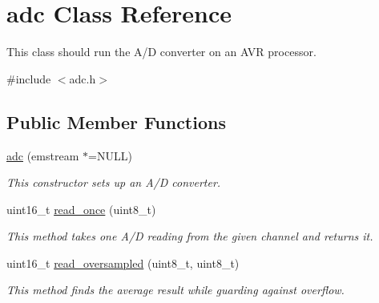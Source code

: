 \hypertarget{classadc}{\section{adc \-Class \-Reference}
\label{classadc}
}


\-This class should run the \-A/\-D converter on an \-A\-V\-R processor.  




{\ttfamily \#include $<$adc.\-h$>$}

\subsection*{\-Public \-Member \-Functions}
\begin{DoxyCompactItemize}
\item 
\hyperlink{classadc_af3b8262c08f5fc5ae325a20622883424}{adc} (emstream $\ast$=\-N\-U\-L\-L)
\begin{DoxyCompactList}\small\item\em \-This constructor sets up an \-A/\-D converter. \end{DoxyCompactList}\item 
uint16\-\_\-t \hyperlink{classadc_a2190a59696a7093e1ea605e998ccf97e}{read\-\_\-once} (uint8\-\_\-t)
\begin{DoxyCompactList}\small\item\em \-This method takes one \-A/\-D reading from the given channel and returns it. \end{DoxyCompactList}\item 
uint16\-\_\-t \hyperlink{classadc_a58f1030fe64d3dea4ccd8a2687dd6fce}{read\-\_\-oversampled} (uint8\-\_\-t, uint8\-\_\-t)
\begin{DoxyCompactList}\small\item\em \-This method finds the average result while guarding against overflow. \end{DoxyCompactList}\end{DoxyCompactItemize}
